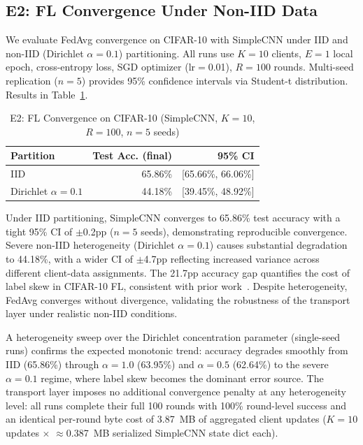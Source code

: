 \documentclass[a4paper,fleqn]{cas-dc}
\begin{document}
\subsection{E2: FL Convergence Under Non-IID Data}
\label{sec:e2}

We evaluate FedAvg convergence on CIFAR-10 with SimpleCNN under IID and non-IID (Dirichlet $\alpha{=}0.1$) partitioning. All runs use $K{=}10$ clients, $E{=}1$ local epoch, cross-entropy loss, SGD optimizer (lr$=$0.01), $R{=}100$ rounds. Multi-seed replication ($n{=}5$) provides 95\% confidence intervals via Student-t distribution. Results in Table~\ref{tab:e2}.

\begin{table}[t]
\centering
\caption{E2: FL Convergence on CIFAR-10 (SimpleCNN, $K{=}10$, $R{=}100$, $n{=}5$ seeds)}
\label{tab:e2}
\footnotesize
\begin{tabular}{l r r}
\toprule
\textbf{Partition} & \textbf{Test Acc. (final)} & \textbf{95\% CI} \\
\midrule
IID                  & 65.86\% & [65.66\%, 66.06\%] \\
Dirichlet $\alpha{=}0.1$ & 44.18\% & [39.45\%, 48.92\%] \\
\bottomrule
\end{tabular}
\end{table}

Under IID partitioning, SimpleCNN converges to 65.86\% test accuracy with a tight 95\% CI of $\pm$0.2pp ($n{=}5$ seeds), demonstrating reproducible convergence. Severe non-IID heterogeneity (Dirichlet $\alpha{=}0.1$) causes substantial degradation to 44.18\%, with a wider CI of $\pm$4.7pp reflecting increased variance across different client-data assignments. The 21.7pp accuracy gap quantifies the cost of label skew in CIFAR-10 FL, consistent with prior work~\cite{li2020federated,scaffold2020}. Despite heterogeneity, FedAvg converges without divergence, validating the robustness of the transport layer under realistic non-IID conditions.

A heterogeneity sweep over the Dirichlet concentration parameter (single-seed runs) confirms the expected monotonic trend: accuracy degrades smoothly from IID (65.86\%) through $\alpha{=}1.0$ (63.95\%) and $\alpha{=}0.5$ (62.64\%) to the severe $\alpha{=}0.1$ regime, where label skew becomes the dominant error source. The transport layer imposes no additional convergence penalty at any heterogeneity level: all runs complete their full 100 rounds with 100\% round-level success and an identical per-round byte cost of 3.87~MB of aggregated client updates ($K{=}10$ updates $\times$ $\approx$0.387~MB serialized SimpleCNN state dict each).
\end{document}
